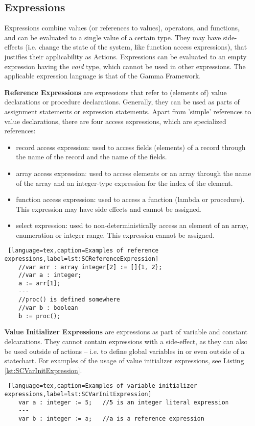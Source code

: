 \subsection{Expressions}
Expressions combine values (or references to values), operators, and functions, and can be evaluated to a single value of a certain type. They may have side-effects (i.e. change the state of the system, like function access expressions), that justifies their applicability as Actions. Expressions can be evaluated to an empty expression having the \textit{void} type, which cannot be used in other expressions. The applicable expression language is that of the Gamma Framework.

\textbf{Reference Expressions} are expressions that refer to (elements of) value declarations or procedure declarations. Generally, they can be used as parts of assignment statements or expression statements. Apart from 'simple' references to value declarations, there are four access expressions, which are specialized references:
\begin{itemize}
	\item record access expression: used to access fields (elements) of a record through the name of the record and the name of the fields.
	\item array access expression: used to access elements or an array through the name of the array and an integer-type expression for the index of the element.
	\item function access expression: used to access a function (lambda or procedure). This expression may have side effects and cannot be assigned.
	\item select expression: used to non-deterministically access an element of an array, enumeration or integer range. This expression cannot be assigned.
\end{itemize}
\begin{lstlisting} [language=tex,caption=Examples of reference expressions,label=lst:SCReferenceExpression]
	//var arr : array integer[2] := []{1, 2};
	//var a : integer; 
	a := arr[1];
	---
	//proc() is defined somewhere
	//var b : boolean 
	b := proc();
\end{lstlisting}

\textbf{Value Initializer Expressions} are expressions as part of variable and constant delcarations. They cannot contain expressions with a side-effect, as they can also be used outside of actions -- i.e. to define global variables in or even outside of a statechart. For examples of the usage of value initializer expressions, see Listing \ref{lst:SCVarInitExpression}.
\bigskip
\begin{lstlisting} [language=tex,caption=Examples of variable initializer expressions,label=lst:SCVarInitExpression]
	var a : integer := 5;	//5 is an integer literal expression
	---
	var b : integer := a;	//a is a reference expression		
\end{lstlisting}

